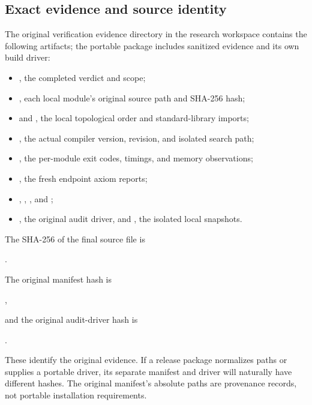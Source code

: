 \subsection{Exact evidence and source identity}
The original verification evidence directory in the research workspace contains the following artifacts; the portable package includes sanitized evidence and its own build driver:
\begin{itemize}
\item {}, the completed verdict and scope;
\item {}, each local module's original source path and SHA-256 hash;
\item {} and , the local topological order and standard-library imports;
\item {}, the actual compiler version, revision, and isolated search path;
\item {}, the per-module exit codes, timings, and memory observations;
\item {}, the fresh endpoint axiom reports;
\item {}, , , and ;
\item {}, the original audit driver, and , the isolated local snapshots.
\end{itemize}
The SHA-256 of the final source file  is
\begin{center}.\end{center}
The original manifest hash is
\begin{center},\end{center}
and the original audit-driver hash is
\begin{center}.\end{center}
These identify the original evidence. If a release package normalizes paths or supplies a portable driver, its separate manifest and driver will naturally have different hashes. The original manifest's absolute paths are provenance records, not portable installation requirements.

